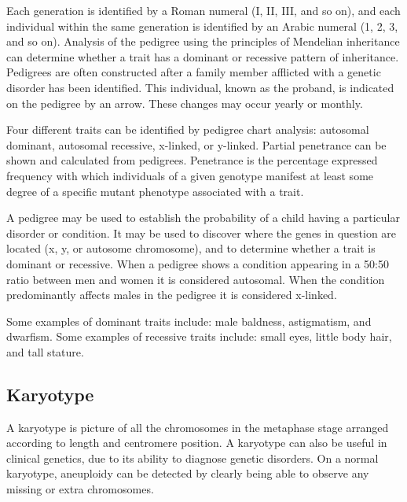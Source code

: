 Each generation is identified by a Roman numeral (I, II, III, and so on), and each individual within the same generation is identified by an Arabic numeral (1, 2, 3, and so on). Analysis of the pedigree using the principles of Mendelian inheritance can determine whether a trait has a dominant or recessive pattern of inheritance. Pedigrees are often constructed after a family member afflicted with a genetic disorder has been identified. This individual, known as the proband, is indicated on the pedigree by an arrow. These changes may occur yearly or monthly.

Four different traits can be identified by pedigree chart analysis: autosomal dominant, autosomal recessive, x-linked, or y-linked. Partial penetrance can be shown and calculated from pedigrees. Penetrance is the percentage expressed frequency with which individuals of a given genotype manifest at least some degree of a specific mutant phenotype associated with a trait.

A pedigree may be used to establish the probability of a child having a particular disorder or condition. It may be used to discover where the genes in question are located (x, y, or autosome chromosome), and to determine whether a trait is dominant or recessive. When a pedigree shows a condition appearing in a 50:50 ratio between men and women it is considered autosomal. When the condition predominantly affects males in the pedigree it is considered x-linked.

Some examples of dominant traits include: male baldness, astigmatism, and dwarfism. Some examples of recessive traits include: small eyes, little body hair, and tall stature.

\hypertarget{karyotype}{%
\subsection{Karyotype}\label{karyotype}}

A karyotype is picture of all the chromosomes in the metaphase stage arranged according to length and centromere position. A karyotype can also be useful in clinical genetics, due to its ability to diagnose genetic disorders. On a normal karyotype, aneuploidy can be detected by clearly being able to observe any missing or extra chromosomes.



